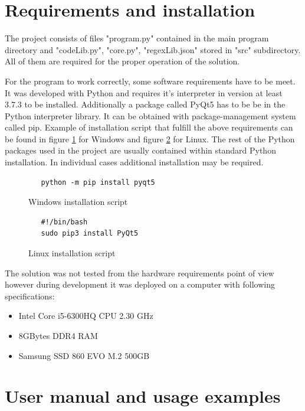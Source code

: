 \documentclass[a4paper,twoside,12pt]{book}
\begin{document}
\section{Requirements and installation}

The project consists of files "program.py" contained in the main program directory and
"codeLib.py", "core.py", "regexLib.json" stored in "src" subdirectory. All of them are 
required for the proper operation of the solution.

For the program to work correctly, some software requirements have to be meet. It was developed with 
Python and requires it's interpreter in version at least 3.7.3 to be installed. Additionally a package called PyQt5 has 
to be be in the Python interpreter library. It can be obtained with package-management 
system called pip. Example of installation script that fulfill the above requirements can be found
in figure \ref{fig:windowsScript} for Windows and figure \ref{fig:linuxScript} for Linux.
The rest of the Python packages used in the project are usually contained within standard Python installation.
In individual cases additional installation may be required.

\begin{figure}
   \centering
   \begin{lstlisting}
   python -m pip install pyqt5
   \end{lstlisting}
   \caption{Windows installation script}
   \label{fig:windowsScript}
\end{figure}

\begin{figure}
   \centering
   \begin{lstlisting}
   #!/bin/bash
   sudo pip3 install PyQt5
   \end{lstlisting}
   \caption{Linux installation script}
   \label{fig:linuxScript}
\end{figure}

The solution was not tested from the hardware requirements point of view however 
during development it was deployed on a computer with following specifications:

\begin{itemize}
   \item Intel Core i5-6300HQ CPU 2.30 GHz
   \item 8GBytes DDR4 RAM
   \item Samsung SSD 860 EVO M.2 500GB
\end{itemize}

\section{User manual and usage examples}
\end{document}
